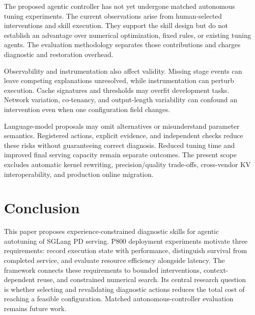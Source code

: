 \documentclass[preprint,12pt]{elsarticle}
\begin{document}
The proposed agentic controller has not yet undergone matched autonomous tuning experiments. The current observations arise from human-selected interventions and skill execution. They support the skill design but do not establish an advantage over numerical optimization, fixed rules, or existing tuning agents. The evaluation methodology separates those contributions and charges diagnostic and restoration overhead.

Observability and instrumentation also affect validity. Missing stage events can leave competing explanations unresolved, while instrumentation can perturb execution. Cache signatures and thresholds may overfit development tasks. Network variation, co-tenancy, and output-length variability can confound an intervention even when one configuration field changes.

Language-model proposals may omit alternatives or misunderstand parameter semantics. Registered actions, explicit evidence, and independent checks reduce these risks without guaranteeing correct diagnosis. Reduced tuning time and improved final serving capacity remain separate outcomes. The present scope excludes automatic kernel rewriting, precision/quality trade-offs, cross-vendor KV interoperability, and production online migration.

\section{Conclusion}
This paper proposes experience-constrained diagnostic skills for agentic autotuning of SGLang PD serving. P800 deployment experiments motivate three requirements: record execution state with performance, distinguish survival from completed service, and evaluate resource efficiency alongside latency. The framework connects these requirements to bounded interventions, context-dependent reuse, and constrained numerical search. Its central research question is whether selecting and revalidating diagnostic actions reduces the total cost of reaching a feasible configuration. Matched autonomous-controller evaluation remains future work.



{\footnotesize
{}
\setlength{\bibsep}{2pt plus 1pt minus 1pt}


}
\end{document}
